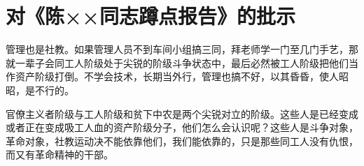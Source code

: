 \section[对《陈××同志蹲点报告》的批示（一九六五年一月二十九日）]{对《陈××同志蹲点报告》的批示}


管理也是社教。如果管理人员不到车间小组搞三同，拜老师学一门至几门手艺，那就一辈子会同工人阶级处于尖锐的阶级斗争状态中，最后必然被工人阶级把他们当作资产阶级打倒。不学会技术，长期当外行，管理也搞不好，以其昏昏，使人昭昭，是不行的。

官僚主义者阶级与工人阶级和贫下中农是两个尖锐对立的阶级。这些人是已经变成或者正在变成吸工人血的资产阶级分子，他们怎么会认识呢？这些人是斗争对象，革命对象，社教运动决不能依靠他们，我们能依靠的，只是那些同工人没有仇恨，而又有革命精神的干部。

